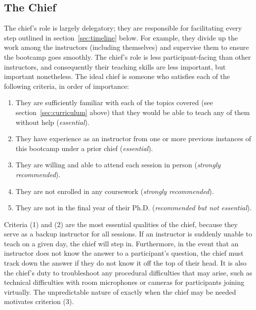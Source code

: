 \subsection{The Chief}
\label{sec:instructors:chief}
\noindent
The chief’s role is largely delegatory; they are responsible for facilitating
every step outlined in section~\ref{sec:timeline} below.
For example, they divide up the work among the instructors (including
themselves) and supervise them to ensure the bootcamp goes smoothly.
The chief’s role is less participant-facing than other instructors, and
consequently their teaching skills are less important, but important
nonetheless.
The ideal chief is someone who satisfies each of the following criteria, in
order of importance:
\begin{enumerate}[topsep=0pt, itemsep=0pt, partopsep=0pt, parsep=0pt]

	\item They are sufficiently familiar with each of the topics covered (see
	section~\ref{sec:curriculum} above) that they would be able to teach any of
	them without help (\textit{essential}).

	\item They have experience as an instructor from one or more previous
	instances of this bootcamp under a prior chief (\textit{essential}).

	\item They are willing and able to attend each session in person
	(\textit{strongly recommended}).

	\item They are not enrolled in any coursework (\textit{strongly
	recommended}).

	\item They are not in the final year of their Ph.D. (\textit{recommended
	but not essential}).
\end{enumerate}
Criteria (1) and (2) are the most essential qualities of the chief, because
they serve as a backup instructor for all sessions.
If an instructor is suddenly unable to teach on a given day, the chief will
step in.
Furthermore, in the event that an instructor does not know the answer to a
participant’s question, the chief must track down the answer if they do not
know it off the top of their head.
It is also the chief’s duty to troubleshoot any procedural difficulties that
may arise, such as technical difficulties with room microphones or cameras for
participants joining virtually.
The unpredictable nature of exactly when the chief may be needed motivates
criterion (3).
